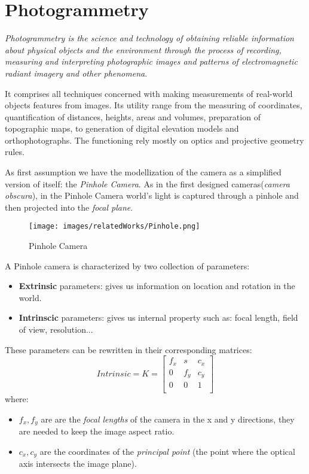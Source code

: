 \section{Photogrammetry}
\textit{Photogrammetry is the science and technology of 
obtaining reliable information about physical objects and
the environment through the process of recording,
measuring and interpreting photographic images and patterns 
of electromagnetic radiant imagery and other 
phenomena}\cite{examplewebsite}.

It comprises all techniques concerned with making measurements of
real-world objects features from images.
Its utility range from the measuring of coordinates, quantification
of distances, heights, areas and volumes, preparation
of topographic maps, to generation of digital elevation 
models and orthophotographs. The functioning rely mostly on optics and projective geometry rules. 

\vspace{12pt}

As first assumption we have the modellization of the camera as a simplified
version of itself: the \textit{Pinhole Camera}. As in the first designed
cameras(\textit{camera obscura}), in the Pinhole Camera world's light is 
captured through a pinhole and then projected into the \textit{focal plane}.

\begin{figure}
    \centering
    \texttt{[image: images/relatedWorks/Pinhole.png]} %
    \caption{Pinhole Camera}
    \label{fig:pinhole}
  \end{figure}
  
A Pinhole camera is characterized by two collection of parameters:
\begin{itemize}
    \item  \textbf{Extrinsic} parameters: gives us information on location
                                        and rotation in the world.
    \item  \textbf{Intrinscic} parameters: gives us internal property such as:
                                    focal length, field of view, resolution...
\end{itemize}  
These parameters can be rewritten in their corresponding matrices:
\[
  Intrinsic=K= \begin{bmatrix}
    f_{x} & s & c_{x} \\
    0 & f_{y} & c_{y} \\
    0 & 0     & 1     \\
  \end{bmatrix}
\]
where:
\begin{itemize}
    \item $f_{x},f_{y}$ are are the \textit{focal lengths} of the camera in the x and y directions, 
    they are needed to keep the image aspect ratio.
    \item $c_{x},c_{y}$ are the coordinates of the \textit{principal point}
    (the point where the optical axis intersects the image plane).
\end{itemize}

